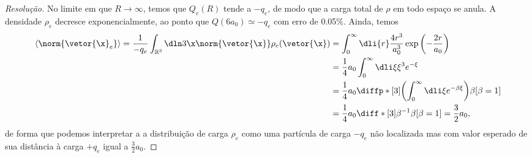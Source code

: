 \begin{proof}[Resolução]
    No limite em que \(R \to \infty\), temos que \(Q_e(R)\) tende a \(-q_e\), de modo que a carga total de \(\rho\) em todo espaço se anula. A densidade \(\rho_e\) decresce exponencialmente, ao ponto que \(Q(6 a_0) \simeq -q_e\) com erro de 0.05\%. Ainda, temos
    \begin{align*}
        \langle \norm{\vetor{\x}_e} \rangle = \frac{1}{-q_e} \int_{\mathbb{R}^3} \dln3\x \norm{\vetor{\x}} \rho_e(\vetor{\x})
        &= \int_0^\infty \dli{r} \frac{4r^3}{a_0^3}\exp\left(-\frac{2r}{a_0}\right)\\
        &= \frac14a_0 \int_0^\infty \dli\xi \xi^3 e^{-\xi}\\
        &= \frac14a_0 \diffp*[3]{\left(\int_0^\infty \dli\xi e^{-\beta \xi}\right)}{\beta}[\beta = 1]\\
        &= \frac14a_0 \diff*[3]{\beta^{-1}}{\beta}[\beta = 1]= \frac32a_0,
    \end{align*}
    de forma que podemos interpretar a a distribuição de carga \(\rho_e\) como uma partícula de carga \(-q_e\) não localizada mas com valor esperado de sua distância à carga \(+q_e\) igual a \(\frac32 a_0\).
\end{proof}
